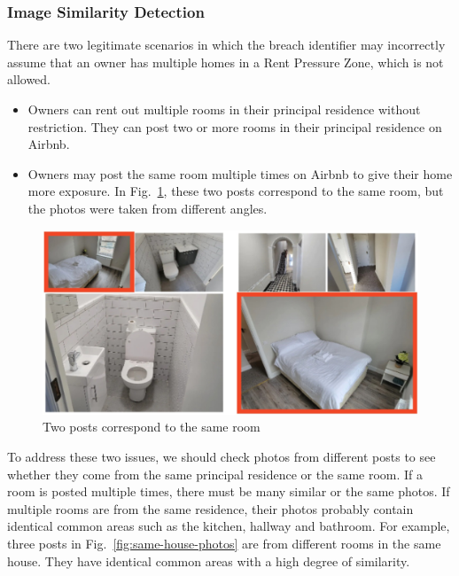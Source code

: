 \documentclass[conference, compsoc]{IEEEtran}
\begin{document}
\subsubsection{Image Similarity Detection}
There are two legitimate scenarios in which the breach identifier may incorrectly assume that an owner has multiple homes in a Rent Pressure Zone, which is not allowed.
\begin{itemize}
    \item
    Owners can rent out multiple rooms in their principal residence without restriction.
    They can post two or more rooms in their principal residence on Airbnb.

    \item
    Owners may post the same room multiple times on Airbnb to give their home more exposure.
    In Fig.~\ref{fig:same-room-photos}, these two posts correspond to the same room, but the photos were taken from different angles.
\end{itemize}

\begin{figure}[htbp]
    \centerline{\includegraphics[width=\linewidth]{figures/same-room-photos.jpg}}
    \caption{Two posts correspond to the same room}
    \label{fig:same-room-photos}
\end{figure}

To address these two issues, we should check photos from different posts to see whether they come from the same principal residence or the same room.
If a room is posted multiple times, there must be many similar or the same photos.
If multiple rooms are from the same residence, their photos probably contain identical common areas such as the kitchen, hallway and bathroom.
For example, three posts in Fig.~\ref{fig:same-house-photos} are from different rooms in the same house.
They have identical common areas with a high degree of similarity.
\end{document}
